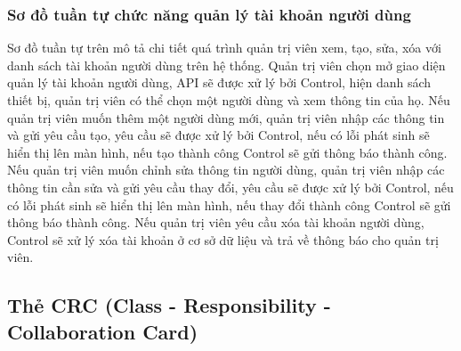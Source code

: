 \subsubsection{Sơ đồ tuần tự chức năng quản lý tài khoản người dùng}

Sơ đồ tuần tự trên mô tả chi tiết quá trình quản trị viên xem, tạo, sửa, xóa với danh sách tài khoản người dùng trên hệ thống. Quản trị viên chọn mở giao diện
quản lý tài khoản người dùng, API sẽ được xử lý bởi Control, hiện danh sách thiết bị, quản trị viên có thể chọn một người dùng và xem thông tin của họ. Nếu quản trị viên
muốn thêm một người dùng mới, quản trị viên nhập các thông tin và gửi yêu cầu tạo, yêu cầu sẽ được xử lý bởi Control, nếu có lỗi phát sinh sẽ hiển thị lên màn hình,
nếu tạo thành công Control sẽ gửi thông báo thành công. Nếu quản trị viên muốn chỉnh sửa thông tin người dùng, quản trị viên nhập các thông tin cần sửa và gửi yêu cầu
thay đổi, yêu cầu sẽ được xử lý bởi Control, nếu có lỗi phát sinh sẽ hiển thị lên màn hình, nếu thay đổi thành công Control sẽ gửi thông báo thành công. Nếu quản trị viên
yêu cầu xóa tài khoản người dùng, Control sẽ xử lý xóa tài khoản ở cơ sở dữ liệu và trả về thông báo cho quản trị viên.

\subsection{Thẻ CRC (Class - Responsibility - Collaboration Card)}

